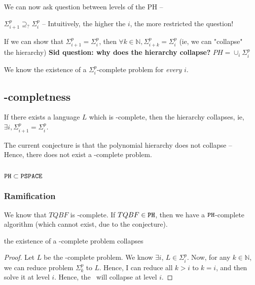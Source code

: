 We can now ask question between levels of the PH --

$\Sigma_{i+1}^p \supseteq_? \Sigma_i^p$ -- Intuitively, the higher the $i$, the
more restricted the question!

If we can show that  $\Sigma_{i+1}^p= \Sigma_i^p$, then $\forall k \in \mathbb{N}, \Sigma_{i+k}^p= \Sigma_i^p$
(ie, we can "collapse" the hierarchy)
\textbf{Sid question: why does the hierarchy collapse?}
$PH = \cup_i \Sigma_i^p$


We know the existence of a $\Sigma_i^p$-complete problem for \textit{every $i$}.

\subsection{\phtime-completness}

If there exists a language $L$ which is \phtime-complete, then the hierarchy collapses,
ie, $\exists i, \Sigma_{i+1}^p = \Sigma_i^p$.

The current conjecture is that the polynomial hierarchy does not collapse -- Hence,
there does not exist a \phtime-complete problem.

\subsection{$\texttt{PH} \subset \texttt{PSPACE}$}

\subsubsection{Ramification}
We know that $TQBF$ is \pspace-complete. If $TQBF \in \texttt{PH}$, then we
have a $\texttt{PH}$-complete algorithm (which cannot exist, due to the conjecture).

\begin{theorem}the existence of a \phtime-complete problem collapses \phtime
\end{theorem}
\begin{proof}
    Let $L$ be the \phtime-complete problem. We know $\exists i$, 
    $L \in \Sigma_i^p$. Now, for any $k \in \mathbb{N}$, we can reduce problem
    $\Sigma_k^p$ to $L$. Hence, I can reduce all $k > i$ to $k = i$, and then
    solve it at level $i$. Hence, the \phtime~will collapse at level $i$.
\end{proof}
